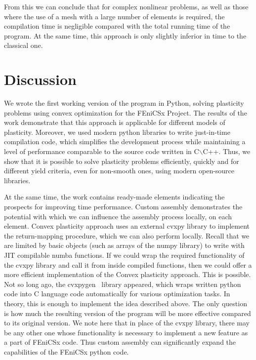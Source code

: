 \documentclass[12pt]{article}
\begin{document}
From this we can conclude that for complex nonlinear problems, as well as those where the use of a mesh with a large number of elements is required, the compilation time is negligible compared with the total running time of the program. At the same time, this approach is only slightly inferior in time to the classical one.

\newpage
\section{Discussion}

We wrote the first working version of the program in Python, solving plasticity problems using convex optimization for the FEniCSx Project. The results of the work demonstrate that this approach is applicable for different models of plasticity. Moreover, we used modern python libraries to write just-in-time compilation code, which simplifies the development process while maintaining a level of performance comparable to the source code written in C$\backslash$C++. Thus, we show that it is possible to solve plasticity problems efficiently, quickly and for different yield criteria, even for non-smooth ones, using modern open-source libraries. 

At the same time, the work contains ready-made elements indicating the prospects for improving time performance. Custom assembly demonstrates the potential with which we can influence the assembly process locally, on each element. Convex plasticity approach uses an external cvxpy library to implement the return-mapping procedure, which we can also perform locally. Recall that we are limited by basic objects (such as arrays of the numpy library) to write with JIT compilable numba functions. If we could wrap the required functionality of the cvxpy library and call it from inside compiled functions, then we could offer a more efficient implementation of the Convex plasticity approach. This is possible. Not so long ago, the cvxpygen~\parencite{cvxpygen2022} library appeared, which wraps written python code into C language code automatically for various optimization tasks. In theory, this is enough to implement the idea described above. The only question is how much the resulting version of the program will be more effective compared to its original version. We note here that in place of the cvxpy library, there may be any other one whose functionality is necessary to implement a new feature as a part of FEniCSx code. Thus custom assembly can significantly expand the capabilities of the FEniCSx python code.
\end{document}
